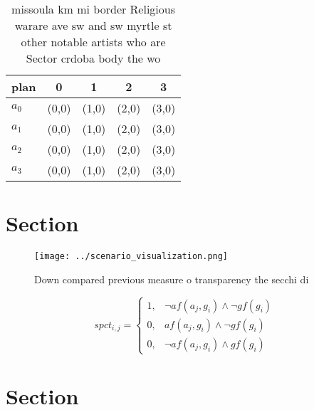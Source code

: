 \documentclass[a4paper]{article}
\begin{document}
\begin{table}
\begin{adjustbox}{width=0.9\columnwidth}
\begin{tabular}{|l|l|l|l|l|}
\hline
\textbf{plan} & \multicolumn{1}{c|}{\textbf{0}} & \multicolumn{1}{c|}{\textbf{1}} & \multicolumn{1}{c|}{\textbf{2}} & \multicolumn{1}{c|}{\textbf{3}} \\ \hline
\textbf{$a_0$}  & (0,0) & (1,0) & (2,0) & (3,0) \\ \hline
\textbf{$a_1$}  & (0,0) & (1,0) & (2,0) & (3,0) \\ \hline
\textbf{$a_2$}  & (0,0) & (1,0) & (2,0) & (3,0) \\ \hline
\textbf{$a_3$}  & (0,0) & (1,0) & (2,0) & (3,0) \\ \hline
\end{tabular}
\end{adjustbox}
\caption{ missoula km mi border Religious warare ave sw and sw myrtle st other notable artists who are Sector crdoba body the wo
}
\end{table}

\section{Section}

\begin{figure}
\centering
\texttt{[image: ../scenario\_visualization.png]}
\caption{Down compared previous measure o transparency the secchi di
}
\end{figure}
 
\begin{equation}
spct_{i,j} =
\begin{cases}
1, & \text{$\neg af(a_j,g_i) \wedge \neg gf(g_i)$}\\
0, & \text{$af(a_j,g_i) \wedge \neg gf(g_i)$}\\
0, & \text{$\neg af(a_j,g_i) \wedge gf(g_i)$}
\end{cases}
\end{equation}

\section{Section}
\end{document}
